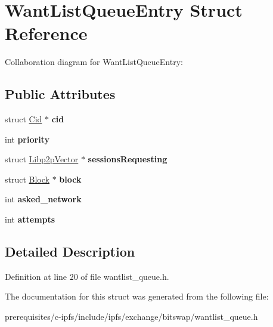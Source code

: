 \hypertarget{struct_want_list_queue_entry}{}\section{Want\+List\+Queue\+Entry Struct Reference}
\label{struct_want_list_queue_entry}


Collaboration diagram for Want\+List\+Queue\+Entry\+:
\subsection*{Public Attributes}
\begin{DoxyCompactItemize}
\item 
\mbox{\label{struct_want_list_queue_entry_a1d71974508d3000ae345dc6422e94405}} 
struct \mbox{\hyperlink{struct_cid}{Cid}} $\ast$ {\bfseries cid}
\item 
\mbox{\label{struct_want_list_queue_entry_a6b97ab29f9f5312ab703d4fe3c5610bf}} 
int {\bfseries priority}
\item 
\mbox{\label{struct_want_list_queue_entry_a20f5c2e934a8b3ebef3d27abf6e3f81d}} 
struct \mbox{\hyperlink{struct_libp2p_vector}{Libp2p\+Vector}} $\ast$ {\bfseries sessions\+Requesting}
\item 
\mbox{\label{struct_want_list_queue_entry_af1fa46cae39f066d1706c0395403f171}} 
struct \mbox{\hyperlink{struct_block}{Block}} $\ast$ {\bfseries block}
\item 
\mbox{\label{struct_want_list_queue_entry_a005d722cfa9744db248395eb0ab20963}} 
int {\bfseries asked\+\_\+network}
\item 
\mbox{\label{struct_want_list_queue_entry_ab5787e2aa7c17313c9141a27a4796669}} 
int {\bfseries attempts}
\end{DoxyCompactItemize}


\subsection{Detailed Description}


Definition at line 20 of file wantlist\+\_\+queue.\+h.



The documentation for this struct was generated from the following file\+:\begin{DoxyCompactItemize}
\item 
prerequisites/c-\/ipfs/include/ipfs/exchange/bitswap/wantlist\+\_\+queue.\+h\end{DoxyCompactItemize}
